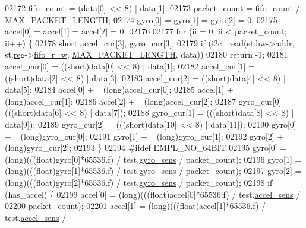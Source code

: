 \begin{DoxyCode}
{{{{{{{02172     fifo\_count = (data[0] << 8) | data[1];
02173     packet\_count = fifo\_count / \hyperlink{inv__mpu_8c_a973c680573b37fc359fc68d0707da355}{MAX\_PACKET\_LENGTH};
02174     gyro[0] = gyro[1] = gyro[2] = 0;
02175     accel[0] = accel[1] = accel[2] = 0;
02176 
02177     \textcolor{keywordflow}{for} (ii = 0; ii < packet\_count; ii++) \{
02178         \textcolor{keywordtype}{short} accel\_cur[3], gyro\_cur[3];
02179         \textcolor{keywordflow}{if} (\hyperlink{_i2_c_8c_ac2d47e7a6c76f93f9b537c31a2986e7b}{i2c\_read}(st.\hyperlink{structgyro__state__s_a5bac30a96752691e4cc723735060e360}{hw}->\hyperlink{structhw__s_a4c34a946600e9d68b6355d23f54d291b}{addr}, st.\hyperlink{structgyro__state__s_ae857e1285c583b7438a208edd691a38e}{reg}->\hyperlink{structgyro__reg__s_a698342c34cc426e84e3435c6b46da120}{fifo\_r\_w}, 
      \hyperlink{inv__mpu_8c_a973c680573b37fc359fc68d0707da355}{MAX\_PACKET\_LENGTH}, data))
02180             \textcolor{keywordflow}{return} -1;
02181         accel\_cur[0] = ((short)data[0] << 8) | data[1];
02182         accel\_cur[1] = ((short)data[2] << 8) | data[3];
02183         accel\_cur[2] = ((short)data[4] << 8) | data[5];
02184         accel[0] += (long)accel\_cur[0];
02185         accel[1] += (long)accel\_cur[1];
02186         accel[2] += (long)accel\_cur[2];
02187         gyro\_cur[0] = (((short)data[6] << 8) | data[7]);
02188         gyro\_cur[1] = (((short)data[8] << 8) | data[9]);
02189         gyro\_cur[2] = (((short)data[10] << 8) | data[11]);
02190         gyro[0] += (long)gyro\_cur[0];
02191         gyro[1] += (long)gyro\_cur[1];
02192         gyro[2] += (long)gyro\_cur[2];
02193     \}
02194 \textcolor{preprocessor}{#ifdef EMPL\_NO\_64BIT}
02195     gyro[0] = (long)(((\textcolor{keywordtype}{float})gyro[0]*65536.f) / test.\hyperlink{structtest__s_a32da1174cf6569aa99bdff70055bb45a}{gyro\_sens} / packet\_count);
02196     gyro[1] = (long)(((\textcolor{keywordtype}{float})gyro[1]*65536.f) / test.\hyperlink{structtest__s_a32da1174cf6569aa99bdff70055bb45a}{gyro\_sens} / packet\_count);
02197     gyro[2] = (long)(((\textcolor{keywordtype}{float})gyro[2]*65536.f) / test.\hyperlink{structtest__s_a32da1174cf6569aa99bdff70055bb45a}{gyro\_sens} / packet\_count);
02198     \textcolor{keywordflow}{if} (has\_accel) \{
02199         accel[0] = (long)(((\textcolor{keywordtype}{float})accel[0]*65536.f) / test.\hyperlink{structtest__s_a22a1d8ebbceb431baa0dfdc911fbc8ab}{accel\_sens} /
02200             packet\_count);
02201         accel[1] = (long)(((\textcolor{keywordtype}{float})accel[1]*65536.f) / test.\hyperlink{structtest__s_a22a1d8ebbceb431baa0dfdc911fbc8ab}{accel\_sens} /
}}}}}}}
\end{DoxyCode}
